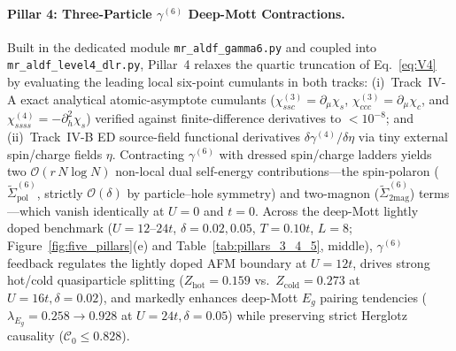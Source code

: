 \documentclass[11pt,a4paper]{article}
\numberwithin{equation}{section}
\theoremstyle{plain}
\theoremstyle{definition}
\begin{document}
\paragraph{Pillar 4: Three-Particle $\gamma^{(6)}$ Deep-Mott Contractions.}
Built in the dedicated module \texttt{mr\_aldf\_gamma6.py} and coupled into \texttt{mr\_aldf\_level4\_dlr.py}, Pillar~4 relaxes the quartic truncation of Eq.~\eqref{eq:V4} by evaluating the leading local six-point cumulants in both tracks: (i)~Track~IV-A exact analytical atomic-asymptote cumulants ($\chi^{(3)}_{ssc} = \partial_\mu\chi_s$, $\chi^{(3)}_{ccc} = \partial_\mu\chi_c$, and $\chi^{(4)}_{ssss} = -\partial_h^2\chi_s$) verified against finite-difference derivatives to $< 10^{-8}$; and (ii)~Track~IV-B ED source-field functional derivatives $\delta\gamma^{(4)}/\delta\eta$ via tiny external spin/charge fields $\eta$. Contracting $\gamma^{(6)}$ with dressed spin/charge ladders yields two $\mathcal{O}(r\,N\log N)$ non-local dual self-energy contributions---the spin-polaron ($\tilde{\Sigma}^{(6)}_{\mathrm{pol}}$, strictly $\mathcal{O}(\delta)$ by particle--hole symmetry) and two-magnon ($\tilde{\Sigma}^{(6)}_{\mathrm{2mag}}$) terms---which vanish identically at $U = 0$ and $t = 0$. Across the deep-Mott lightly doped benchmark ($U = 12$--$24t$, $\delta = 0.02, 0.05$, $T = 0.10t$, $L = 8$; Figure~\ref{fig:five_pillars}(e) and Table~\ref{tab:pillars_3_4_5}, middle), $\gamma^{(6)}$ feedback regulates the lightly doped AFM boundary at $U = 12t$, drives strong hot/cold quasiparticle splitting ($Z_{\mathrm{hot}} = 0.159$ vs.\ $Z_{\mathrm{cold}} = 0.273$ at $U = 16t, \delta = 0.02$), and markedly enhances deep-Mott $E_g$ pairing tendencies ($\lambda_{E_g} = 0.258 \to 0.928$ at $U = 24t, \delta = 0.05$) while preserving strict Herglotz causality ($\mathcal{C}_0 \le 0.828$).
\end{document}

